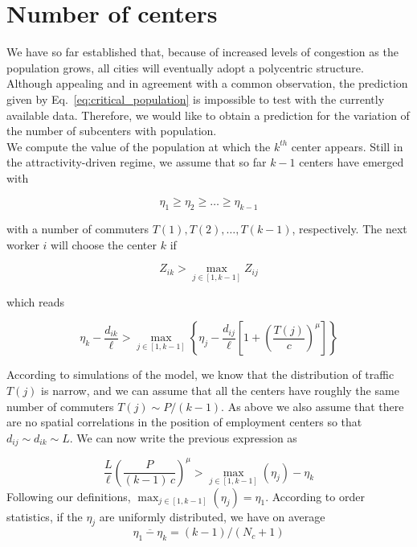 \section{Number of centers}
\label{sec:number_of_centers}


We have so far established that, because of increased levels of congestion as
the population grows, all cities will eventually adopt a polycentric
structure. Although appealing and in agreement with a common observation, the
prediction given by Eq.~\ref{eq:critical_population} is impossible to test with
the currently available data. Therefore, we would like to obtain a prediction
for the variation of the number of subcenters with population.\\

We compute the value of the population at which 
the $k^{th}$ center appears. Still in the attractivity-driven regime, we assume
that so far $k-1$
centers have emerged with 

$$\eta_{1} \geq \eta_{2} \geq \ldots \geq \eta_{k-1}$$

with a number of commuters $T(1), T(2), \ldots,
T(k-1)$, respectively. The next worker $i$ will choose the center $k$ if

\begin{equation}
    Z_{ik} > \max_{j \in \left[1,k-1\right]} Z_{ij}
\end{equation}

which reads

\begin{equation}
    \eta_k - \frac{d_{ik}}{\ell} > \max_{j \in \left[1,k-1\right]} \left\{
    \eta_j - \frac{d_{ij}}{\ell} \left[ 1 + \left(
      \frac{T(j)}{c}\right)^\mu\right] \right\}
\end{equation}

According to simulations of the model, we know that the distribution of traffic $T(j)$ is
narrow, and we can assume that all the centers have roughly the same number of
commuters $T(j) \sim P/(k-1)$. As above we also assume that there are no spatial
correlations in the position of employment centers so that $d_{ij} \sim d_{ik} \sim L$. 
We can now write the previous expression as


\begin{equation}
\frac{L}{\ell} \left( \frac{P}{(k-1)\,c} \right)^{\mu} > \max_{j \in
  \left[1,k-1\right]} \left( \eta_j \right) - \eta_k
\end{equation}
Following our definitions, $\max_{j \in \left[1,k-1\right]} \left(
\eta_j \right) = \eta_1$. According to order statistics, if the
$\eta_j$ are uniformly distributed, we have on average
$$\overline{\eta_1 - \eta_k} = (k-1)/(N_c+1)$$ 

